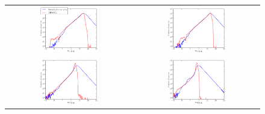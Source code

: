 \documentclass[12pt,preprint]{aastex}
\begin{document}
\begin{figure}
\begin{center}
\begin{tabular}{@{}c@{}c@{}}
  \includegraphics[width=0.48\textwidth]{density-00} &
  \includegraphics[width=0.48\textwidth]{density-01} \\
  \includegraphics[width=0.48\textwidth]{density-02} &
  \includegraphics[width=0.48\textwidth]{density-03}

\end{tabular}
\end{center}
\end{figure}
\end{document}

